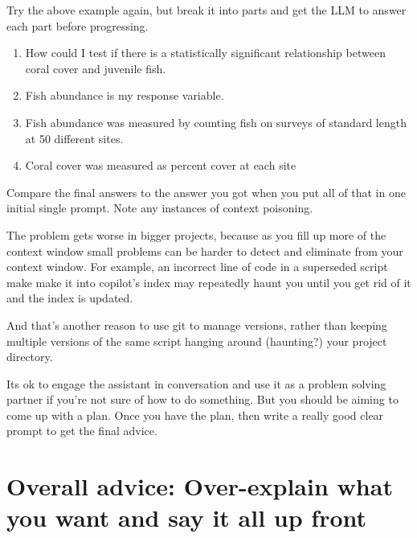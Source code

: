 \documentclass[
  letterpaper,
  DIV=11,
  numbers=noendperiod]{scrreprt}
\providecommand{\tightlist}{%
  \setlength{\itemsep}{0pt}\setlength{\parskip}{0pt}}\usepackage{longtable,booktabs,array}
\begin{document}
Try the above example again, but break it into parts and get the LLM to
answer each part before progressing.

\begin{tcolorbox}[enhanced jigsaw, coltitle=black, breakable, toptitle=1mm, titlerule=0mm, bottomtitle=1mm, colframe=quarto-callout-note-color-frame, left=2mm, leftrule=.75mm, title=\textcolor{quarto-callout-note-color}{\faInfo}\hspace{0.5em}{Note}, opacityback=0, colback=white, opacitybacktitle=0.6, bottomrule=.15mm, arc=.35mm, rightrule=.15mm, toprule=.15mm, colbacktitle=quarto-callout-note-color!10!white]

\begin{enumerate}
\def\labelenumi{\arabic{enumi}.}
\tightlist
\item
  How could I test if there is a statistically significant relationship
  between coral cover and juvenile fish.
\item
  Fish abundance is my response variable.
\item
  Fish abundance was measured by counting fish on surveys of standard
  length at 50 different sites.
\item
  Coral cover was measured as percent cover at each site
\end{enumerate}

\end{tcolorbox}

Compare the final answers to the answer you got when you put all of that
in one initial single prompt. Note any instances of context poisoning.

The problem gets worse in bigger projects, because as you fill up more
of the context window small problems can be harder to detect and
eliminate from your context window. For example, an incorrect line of
code in a superseded script make make it into copilot's index may
repeatedly haunt you until you get rid of it and the index is updated.

And that's another reason to use git to manage versions, rather than
keeping multiple versions of the same script hanging around (haunting?)
your project directory.

Its ok to engage the assistant in conversation and use it as a problem
solving partner if you're not sure of how to do something. But you
should be aiming to come up with a plan. Once you have the plan, then
write a really good clear prompt to get the final advice.

\section{Overall advice: Over-explain what you want and say it all up
front}\label{overall-advice-over-explain-what-you-want-and-say-it-all-up-front}
\end{document}
